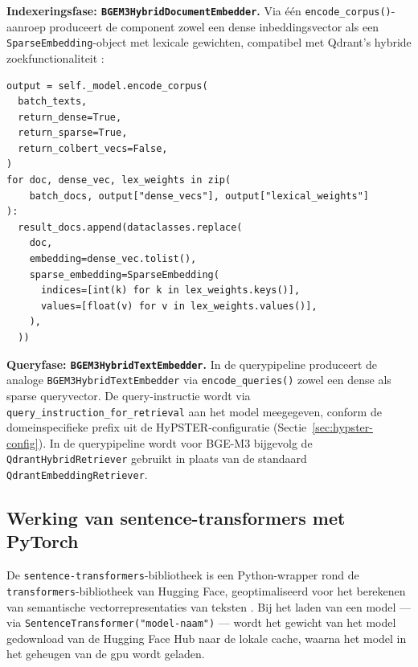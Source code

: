 \textbf{Indexeringsfase: \texttt{BGEM3HybridDocumentEmbedder}.} Via één \texttt{encode\_corpus()}-aanroep produceert de component zowel een dense inbeddingsvector als een \texttt{SparseEmbedding}-object met lexicale gewichten, compatibel met Qdrant's hybride zoekfunctionaliteit \autocite{QdrantHybrid2025}:

\begin{listing}[H]
\begin{verbatim}
output = self._model.encode_corpus(
  batch_texts,
  return_dense=True,
  return_sparse=True,
  return_colbert_vecs=False,
)
for doc, dense_vec, lex_weights in zip(
    batch_docs, output["dense_vecs"], output["lexical_weights"]
):
  result_docs.append(dataclasses.replace(
    doc,
    embedding=dense_vec.tolist(),
    sparse_embedding=SparseEmbedding(
      indices=[int(k) for k in lex_weights.keys()],
      values=[float(v) for v in lex_weights.values()],
    ),
  ))
\end{verbatim}
\caption[BGEM3HybridDocumentEmbedder: dense en sparse vectoren via
encode\_corpus()]{Eén \texttt{encode\_corpus()}-aanroep produceert per
document zowel de dense inbeddingsvector als de sparse lexicale gewichten.
Qdrant slaat beide op voor hybride zoekopdrachten via \gls{rrf}
(Sectie~\ref{subsubsec:hybride-zoeken}).}
\label{lst:bge-m3-doc-embedder}
\end{listing}

\textbf{Queryfase: \texttt{BGEM3HybridTextEmbedder}.} In de querypipeline produceert de analoge \texttt{BGEM3HybridTextEmbedder} via \texttt{encode\_queries()} zowel een dense als sparse queryvector. De query-instructie wordt via \texttt{query\_instruction\_for\_retrieval} aan het model meegegeven, conform de domeinspecifieke prefix uit de HyPSTER-configuratie (Sectie~\ref{sec:hypster-config}). In de querypipeline wordt voor BGE-M3 bijgevolg de \texttt{QdrantHybridRetriever} gebruikt in plaats van de standaard \texttt{QdrantEmbeddingRetriever}.

\subsection{Werking van sentence-transformers met PyTorch}

De \texttt{sentence-transformers}-bibliotheek is een Python-wrapper rond de \texttt{transformers}-bibliotheek van Hugging Face, geoptimaliseerd voor het berekenen van semantische vectorrepresentaties van teksten \autocite{ReimersGurevych2019}. Bij het laden van een model — via \texttt{SentenceTransformer("model-naam")} — wordt het gewicht van het model gedownload van de Hugging Face Hub naar de lokale cache, waarna het model in het geheugen van de \gls{gpu} wordt geladen.

